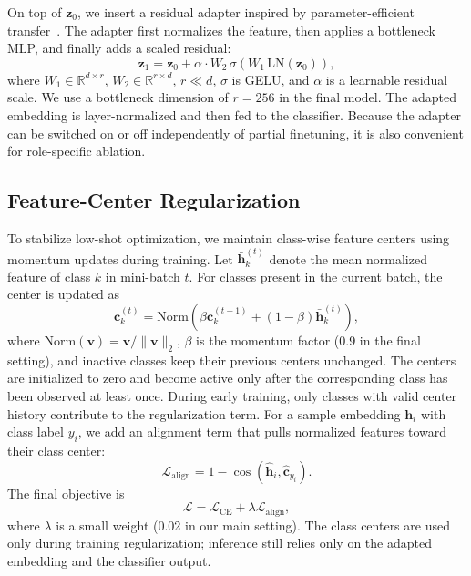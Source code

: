 On top of $\mathbf{z}_0$, we insert a residual adapter inspired by parameter-efficient transfer~\cite{houlsby2019adapter}. The adapter first normalizes the feature, then applies a bottleneck MLP, and finally adds a scaled residual:
\begin{equation}
\mathbf{z}_1 = \mathbf{z}_0 + \alpha \cdot W_2 \, \sigma \left(W_1 \, \text{LN}(\mathbf{z}_0)\right),
\end{equation}
where $W_1 \in \mathbb{R}^{d \times r}$, $W_2 \in \mathbb{R}^{r \times d}$, $r \ll d$, $\sigma$ is GELU, and $\alpha$ is a learnable residual scale. We use a bottleneck dimension of $r=256$ in the final model. The adapted embedding is layer-normalized and then fed to the classifier. Because the adapter can be switched on or off independently of partial finetuning, it is also convenient for role-specific ablation.

\subsection{Feature-Center Regularization}

To stabilize low-shot optimization, we maintain class-wise feature centers using momentum updates during training. Let $\bar{\mathbf{h}}_k^{(t)}$ denote the mean normalized feature of class $k$ in mini-batch $t$. For classes present in the current batch, the center is updated as
\begin{equation}
\mathbf{c}_k^{(t)} = \text{Norm}\left(\beta \mathbf{c}_k^{(t-1)} + (1-\beta)\bar{\mathbf{h}}_k^{(t)}\right),
\end{equation}
where $\text{Norm}(\mathbf{v})=\mathbf{v}/\|\mathbf{v}\|_2$, $\beta$ is the momentum factor (0.9 in the final setting), and inactive classes keep their previous centers unchanged. The centers are initialized to zero and become active only after the corresponding class has been observed at least once. During early training, only classes with valid center history contribute to the regularization term. For a sample embedding $\mathbf{h}_i$ with class label $y_i$, we add an alignment term that pulls normalized features toward their class center:
\begin{equation}
\mathcal{L}_{\text{align}} = 1 - \cos(\hat{\mathbf{h}}_i, \hat{\mathbf{c}}_{y_i}).
\end{equation}
The final objective is
\begin{equation}
\mathcal{L} = \mathcal{L}_{\text{CE}} + \lambda \mathcal{L}_{\text{align}},
\end{equation}
where $\lambda$ is a small weight (0.02 in our main setting). The class centers are used only during training regularization; inference still relies only on the adapted embedding and the classifier output.

